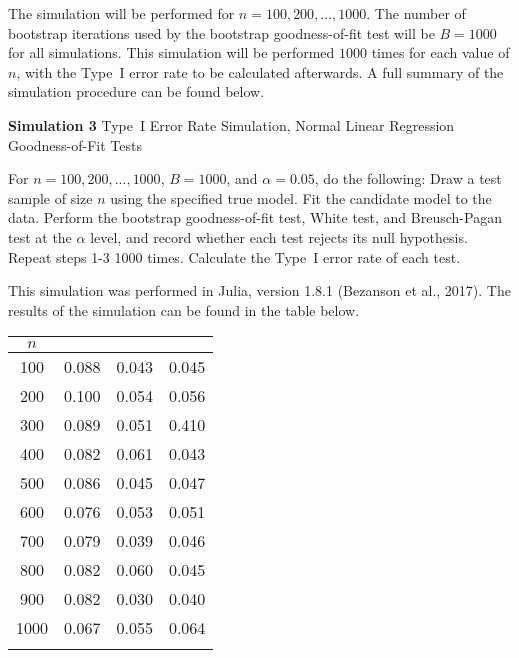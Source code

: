 		The simulation will be performed for $n = 100,200,...,1000$. The number of bootstrap iterations used by the bootstrap goodness-of-fit test will be $B = 1000$ for all simulations.
		This simulation will be performed $1000$ times for each value of $n$, with the Type~I error rate to be calculated afterwards. A full summary of the simulation procedure can be found below.
		\begin{algorithm}[H]
			\caption*{\textbf{Simulation 3} Type~I Error Rate Simulation, Normal Linear Regression Goodness-of-Fit Tests}
			\begin{algorithmic}[1]
			  \Statex For $n = 100,200,...,1000$, $B = 1000$, and $\alpha = 0.05$, do the following:
			  \State Draw a test sample of size $n$ using the specified true model.
			  \State Fit the candidate model to the data.
			  \State Perform the bootstrap goodness-of-fit test, White test, and Breusch-Pagan test at the $\alpha$ level,
			  and record whether each test rejects its null hypothesis.
			  \State Repeat steps 1-3 1000 times.
			  \State Calculate the Type~I error rate of each test.
			\end{algorithmic}
		\end{algorithm}

		This simulation was performed in Julia, version 1.8.1 (Bezanson et al., 2017). The results of the simulation can be found in the table below.

		\begin{table}[H]
			\centering
			\small\addtolength{\tabcolsep}{-3pt}
			\setlength\extrarowheight{-3pt}
			{
			\begin{tabular}{ c|c|c|c}
			$n$ & \vtop{\hbox{\strut Bootstrap}\hbox{\strut Test}} & \vtop{\hbox{\strut White}\hbox{\strut Test}} & \vtop{\hbox{\strut Breusch-Pagan} \hbox{\strut Test}} \\
			 \hline
			 100 & 0.088 & 0.043 & 0.045 \\
			 200 & 0.100 & 0.054 & 0.056 \\
			 300 & 0.089 & 0.051 & 0.410 \\
			 400 & 0.082 & 0.061 & 0.043 \\
			 500 & 0.086 & 0.045 & 0.047 \\
			 600 & 0.076 & 0.053 & 0.051 \\
			 700 & 0.079 & 0.039 & 0.046 \\
			 800 & 0.082 & 0.060 & 0.045 \\
			 900 & 0.082 & 0.030 & 0.040 \\
			 1000 & 0.067 & 0.055 & 0.064 \\
			 \Xhline{3\arrayrulewidth}
			\end{tabular}
			}
		\end{table}

